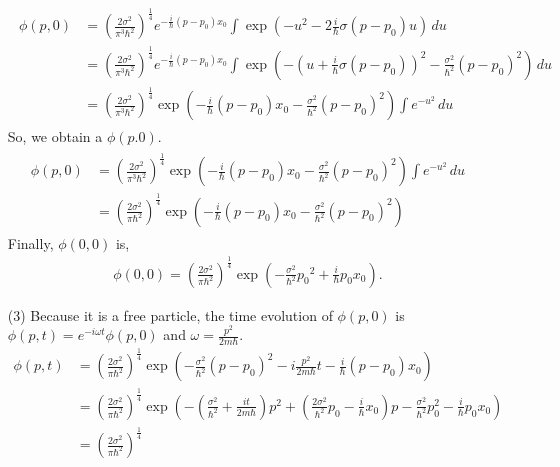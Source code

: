 \documentclass[floatfix,nofootinbib,superscriptaddress,fleqn]{revtex4}
\begin{document}
\begin{itemize}
\begin{align*}
\begin{split}
      \phi(p,0) &= {\left(\frac{2\sigma^2}{\pi^3\hbar^2}\right)}^{\frac{1}{4}}
      e^{-\frac{i}{\hbar}(p-p_0)x_0}
      \int\exp\left(-u^2-2\frac{i}{\hbar}\sigma (p-p_0)u\right)\,du \\
      &={\left(\frac{2\sigma^2}{\pi^3\hbar^2}\right)}^{\frac{1}{4}}
      e^{-\frac{i}{\hbar}(p-p_0)x_0}  
      \int\exp\left(-{\left( u+\frac{i}{\hbar}\sigma (p-p_0)\right)}^2
      -\frac{\sigma^2}{\hbar^2}(p-p_0)^2\right)\,du \\
      &= {\left(\frac{2\sigma^2}{\pi^3\hbar^2}\right)}^{\frac{1}{4}}
      \exp\left( -\frac{i}{\hbar}(p-p_0)x_0
      -\frac{\sigma^2}{\hbar^2}(p-p_0)^2 \right)
      \int e^{-u^2}\,du
    \end{split}
  \end{align*}
  So, we obtain a $\phi(p.0)$.
  \begin{align*}
    \begin{split}
      \phi(p,0) &= {\left(\frac{2\sigma^2}{\pi^3\hbar^2}\right)}
      ^{\frac{1}{4}}
      \exp\left( -\frac{i}{\hbar}(p-p_0)x_0
      -\frac{\sigma^2}{\hbar^2}(p-p_0)^2 \right)
      \int e^{-u^2}\,du \\
      &= {\left(\frac{2\sigma^2}{\pi\hbar^2}\right)}^{\frac{1}{4}}
      \exp\left( -\frac{i}{\hbar}(p-p_0)x_0
      -\frac{\sigma^2}{\hbar^2}(p-p_0)^2 \right)
    \end{split}
  \end{align*}
  Finally, $\phi(0,0)$ is,
  \begin{align}
    \phi(0,0) = {\left(\frac{2\sigma^2}{\pi\hbar^2}\right)}^{\frac{1}{4}}
    \exp\left(-\frac{\sigma^2}{\hbar^2}{p_0}^2+\frac{i}{\hbar}p_0x_0\right).
  \end{align}
  \item[(3)]Because it is a free particle, the time evolution of 
  $\phi(p,0)$ is $\phi(p,t)=e^{-i\omega t}\phi(p,0)$ 
  and $\omega = \frac{p^2}{2m\hbar}$.
  \begin{align*}
      \phi(p,t) &={\left(\frac{2\sigma^2}{\pi\hbar^2}\right)}^{\frac{1}{4}}
      \exp\left(-\frac{\sigma^2}{\hbar^2}(p-p_0)^2-i\frac{p^2}{2m\hbar}t
      -\frac{i}{\hbar}(p-p_0)x_0 \right) \\
      &={\left(\frac{2\sigma^2}{\pi\hbar^2}\right)}^{\frac{1}{4}}
      \exp\left(-\left(\frac{\sigma^2}{\hbar^2} 
      +\frac{it}{2m\hbar}\right)p^2 
      +\left(\frac{2\sigma^2}{\hbar^2}p_0-\frac{i}{\hbar}x_0\right)p 
      -\frac{\sigma^2}{\hbar^2}p_0^2-\frac{i}{\hbar}p_0x_0 \right) \\ 
      &={\left(\frac{2\sigma^2}{\pi\hbar^2}\right)}^{\frac{1}{4}}

\end{align*}
\end{itemize}
\end{document}

